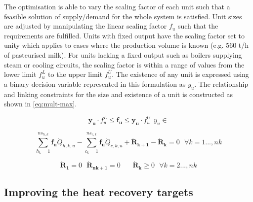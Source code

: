 The optimisation is able to vary the scaling factor of each unit such that a feasible solution of supply/demand for the whole system is satisfied. Unit sizes are adjusted by manipulating the linear scaling factor $f_u$ such that the requirements are fulfilled. Units with fixed output have the scaling factor set to unity which applies to cases where the production volume is known (e.g. 560 t/h of pasteurised milk). For units lacking a fixed output such as boilers supplying steam or cooling circuits, the scaling factor is within a range of values from the lower limit $f_{u}^{L}$ to the upper limit $f_{u}^{U}$. The existence of any unit is expressed using a binary decision variable represented in this formulation as $y_u$. The relationship and linking constraints for the size and existence of a unit is constructed as shown in \ref{eq:mult-max}.

\begin{equation}
\label{eq:mult-max}
\boldsymbol {y_{u}} \cdot f_{u}^{L} \leq \boldsymbol {f_{u}} \leq \boldsymbol {y_{u}} \cdot f_{u}^{U} ~~ {y_{u}} \in 
\end{equation}



\begin{equation}
 \label{eq:heat-cascade}
\sum_{h_k=1}^{ns_{h,k}}{\boldsymbol {f_u} \dot{Q}_{h,k,u}} - \sum_{c_k=1}^{ns_{c,k}}{\boldsymbol {f_u} \dot{Q}_{c,k,u} } +\boldsymbol {\dot{R}_{k+1}}  -\boldsymbol {\dot{R}_{k}}   = 0
~~~\forall k=1...,nk
\end{equation}



\begin{equation}
\label{eq:Rk-constraints}
\boldsymbol {\dot{R}_{1}} = 0 ~~~ \boldsymbol {\dot{R}_{nk+1}}=0 ~~~~~~~~ \boldsymbol {\dot{R}_{k}} \geq 0 ~~~\forall k=2...,nk
\end{equation}

\subsection{Improving the heat recovery targets}
\label{sec:TSIheatrecovery}

